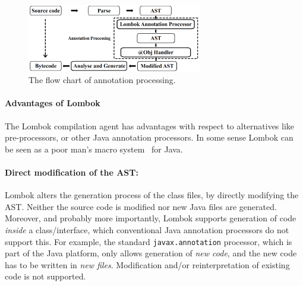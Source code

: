 
\begin{figure}[t]
\centering
\includegraphics[width=3in]{pdfs/lombok3.png}
\caption{The flow chart of \mixin annotation processing.
}
\label{fig:lombok}
\end{figure}


\paragraph{Advantages of Lombok}
The Lombok compilation agent has advantages with respect to alternatives like
pre-processors, or other Java annotation processors. In some sense
Lombok can be seen as a poor man's macro system~\cite{} for Java.


\paragraph{Direct modification of the AST:}
Lombok alters the generation process of the class files,
by directly modifying the AST. Neither the source code is modified nor
new Java files are generated. Moreover, and probably more importantly,
Lombok supports generation of code \emph{inside} a class/interface,
which conventional Java annotation processors do not support this. For
example, the standard \texttt{javax.annotation} processor, which is part of the
Java platform, only allows generation of \emph{new code}, and the
new code has to be written in \emph{new files}. Modification and/or
reinterpretation of existing code is not supported.

